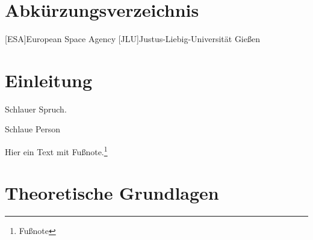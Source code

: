 \documentclass[fontsize=11pt,%
twoside,%
BCOR          = 8mm, %
DIV           = 11,  %
titlepage     = off,%
index=totoc,%
xcolor        = pdftex,%
dvipsnames,%
bibliography  = totoc,%
listof        = notnumbered]{scrreprt}
\begin{document}


\cleardoublepage

\pagestyle{scrheadings}

\setcounter{page}{5} %

\tableofcontents
\cleardoublepage

\listoffigures
\cleardoublepage

\listoftables
\cleardoublepage

\chapter*{Abk\"{u}rzungsverzeichnis}
\begin{acronym}
[ESA]{\dotfill European Space Agency}
[JLU]{\dotfill Justus-Liebig-Universit\"{a}t Gie{\ss}en}
\end{acronym}
\cleardoublepage



\chapter{Einleitung}\label{chap:einleitung}

\epigraph{Schlauer Spruch.}{Schlaue Person}
\noindent{}Hier ein Text mit Fu{\ss}note.\footnote{Fu{\ss}note}
\Blindtext
\cleardoublepage %

\chapter{Theoretische Grundlagen}\label{chap:theorie}
\end{document}
